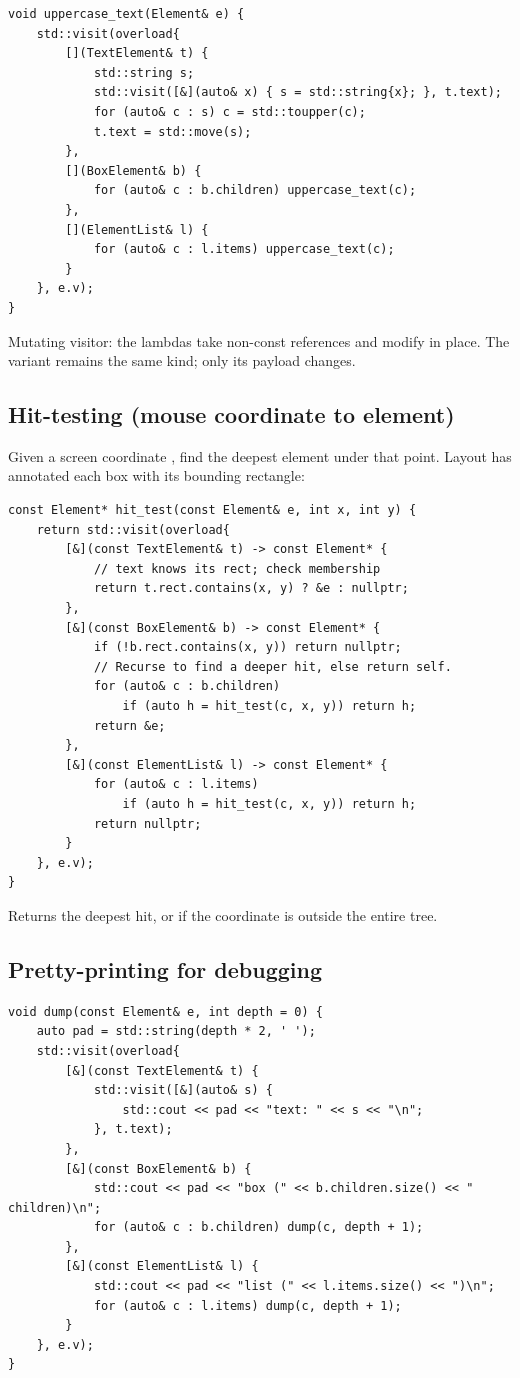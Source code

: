\begin{lstlisting}
void uppercase_text(Element& e) {
    std::visit(overload{
        [](TextElement& t) {
            std::string s;
            std::visit([&](auto& x) { s = std::string{x}; }, t.text);
            for (auto& c : s) c = std::toupper(c);
            t.text = std::move(s);
        },
        [](BoxElement& b) {
            for (auto& c : b.children) uppercase_text(c);
        },
        [](ElementList& l) {
            for (auto& c : l.items) uppercase_text(c);
        }
    }, e.v);
}
\end{lstlisting}

Mutating visitor: the lambdas take non-const references and
modify in place. The variant remains the same kind; only its
payload changes.

\subsection*{Hit-testing (mouse coordinate to element)}

Given a screen coordinate , find the deepest
element under that point. Layout has annotated each box with its
bounding rectangle:

\begin{lstlisting}
const Element* hit_test(const Element& e, int x, int y) {
    return std::visit(overload{
        [&](const TextElement& t) -> const Element* {
            // text knows its rect; check membership
            return t.rect.contains(x, y) ? &e : nullptr;
        },
        [&](const BoxElement& b) -> const Element* {
            if (!b.rect.contains(x, y)) return nullptr;
            // Recurse to find a deeper hit, else return self.
            for (auto& c : b.children)
                if (auto h = hit_test(c, x, y)) return h;
            return &e;
        },
        [&](const ElementList& l) -> const Element* {
            for (auto& c : l.items)
                if (auto h = hit_test(c, x, y)) return h;
            return nullptr;
        }
    }, e.v);
}
\end{lstlisting}

Returns the deepest hit, or  if the coordinate is
outside the entire tree.

\subsection*{Pretty-printing for debugging}

\begin{lstlisting}
void dump(const Element& e, int depth = 0) {
    auto pad = std::string(depth * 2, ' ');
    std::visit(overload{
        [&](const TextElement& t) {
            std::visit([&](auto& s) {
                std::cout << pad << "text: " << s << "\n";
            }, t.text);
        },
        [&](const BoxElement& b) {
            std::cout << pad << "box (" << b.children.size() << " children)\n";
            for (auto& c : b.children) dump(c, depth + 1);
        },
        [&](const ElementList& l) {
            std::cout << pad << "list (" << l.items.size() << ")\n";
            for (auto& c : l.items) dump(c, depth + 1);
        }
    }, e.v);
}
\end{lstlisting}

